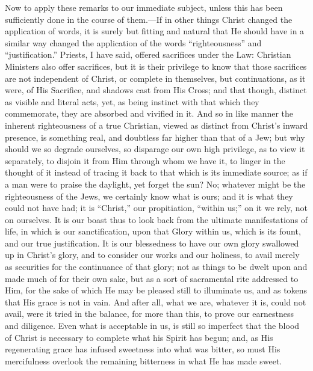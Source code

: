 Now to apply these remarks to our immediate subject, unless this
has been sufficiently done in the course of them.—If in other things
Christ changed the application of words, it is surely but fitting and
natural that He should have in a similar way changed the application
of the words ``righteousness'' and ``justification.''
Priests, I have said, offered sacrifices under the Law: Christian
Ministers also offer sacrifices, but it is their privilege to know
that those sacrifices are not independent of Christ, or complete in
themselves, but continuations, as it were, of His Sacrifice, and
shadows cast from His Cross; and that though, distinct as visible and
literal acts, yet, as being instinct with that which they commemorate,
they are absorbed and vivified in it. And so in like manner the
inherent righteousness of a true Christian, viewed as distinct
from Christ's inward presence, is something real, and doubtless far
higher than that of a Jew; but why should we so degrade ourselves, so
disparage our own high privilege, as to view it separately, to disjoin
it from Him through whom we have it, to linger in the thought of it
instead of tracing it back to that which is its immediate source; as
if a man were to praise the daylight, yet forget the sun? No; whatever
might be the righteousness of the Jews, we certainly know what is
ours; and it is what they could not have had; it is
``Christ,'' our propitiation, ``within us;'' on it we
rely, not on ourselves. It is our boast thus to look back from the
ultimate manifestations of life, in which is our sanctification, upon
that Glory within us, which is its fount, and our true justification.
It is our blessedness to have our own glory swallowed up in Christ's
glory, and to consider our works and our holiness, to avail merely as
securities for the continuance of that glory; not as things to be
dwelt upon and made much of for their own sake, but as a sort of
sacramental rite addressed to Him, for the sake of which He may be
pleased still to illuminate us, and as tokens that His grace is not in
vain. And after all, what we are, whatever it is, could not avail,
were it tried in the balance, for more than this, to prove our
earnestness and diligence. Even what is acceptable in us, is still so
imperfect that the blood of Christ is necessary to complete what his
Spirit has begun; and, as His regenerating grace has infused sweetness
into what was bitter, so must His mercifulness overlook the remaining
bitterness in what He has made sweet.

